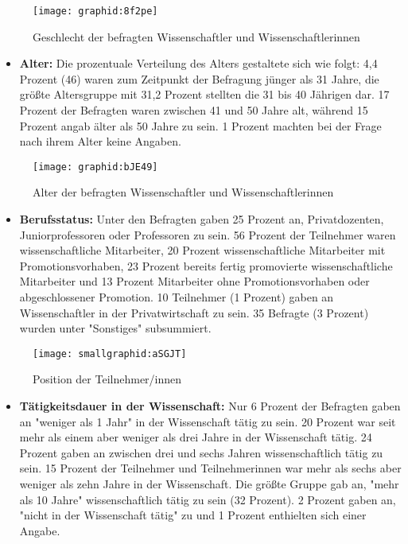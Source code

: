 \begin{figure}[h!]
\texttt{[image: graphid:8f2pe]}
\caption{Geschlecht der befragten Wissenschaftler und Wissenschaftlerinnen}
\end{figure}

\begin{itemize}
\item \textbf{Alter:} Die prozentuale Verteilung des Alters gestaltete sich wie folgt: 4,4 Prozent (46) waren zum Zeitpunkt der Befragung jünger als 31 Jahre, die größte Altersgruppe mit 31,2 Prozent stellten die 31 bis 40 Jährigen dar. 17 Prozent der Befragten waren zwischen 41 und 50 Jahre alt, während 15 Prozent angab älter als 50 Jahre zu sein. 1 Prozent machten bei der Frage nach ihrem Alter keine Angaben.
\end{itemize}

\begin{figure}[h!]
\texttt{[image: graphid:bJE49]}
\caption{Alter der befragten Wissenschaftler und Wissenschaftlerinnen}
\end{figure}

\begin{itemize}
\item \textbf{Berufsstatus:} Unter den Befragten gaben 25 Prozent an, Privatdozenten, Juniorprofessoren oder Professoren zu sein. 56 Prozent der Teilnehmer waren wissenschaftliche Mitarbeiter, 20 Prozent wissenschaftliche Mitarbeiter mit Promotionsvorhaben, 23 Prozent bereits fertig promovierte wissenschaftliche Mitarbeiter und 13 Prozent Mitarbeiter ohne Promotionsvorhaben oder abgeschlossener Promotion. 10 Teilnehmer (1 Prozent) gaben an Wissenschaftler in der Privatwirtschaft zu sein. 35 Befragte (3 Prozent) wurden unter "Sonstiges" subsummiert.
\end{itemize}

\begin{figure}[h!]
\texttt{[image: smallgraphid:aSGJT]}
\caption{Position der Teilnehmer/innen}
\end{figure}

\begin{itemize}
\item \textbf{Tätigkeitsdauer in der Wissenschaft:} Nur 6 Prozent der Befragten gaben an "weniger als 1 Jahr" in der Wissenschaft tätig zu sein. 20 Prozent war seit mehr als einem aber weniger als drei Jahre in der Wissenschaft tätig. 24 Prozent gaben an zwischen drei und sechs Jahren wissenschaftlich tätig zu sein. 15 Prozent der Teilnehmer und Teilnehmerinnen war mehr als sechs aber weniger als zehn Jahre in der Wissenschaft. Die größte Gruppe gab an, "mehr als 10 Jahre" wissenschaftlich tätig zu sein (32 Prozent). 2 Prozent gaben an, "nicht in der Wissenschaft tätig" zu und 1 Prozent enthielten sich einer Angabe.
\end{itemize}

